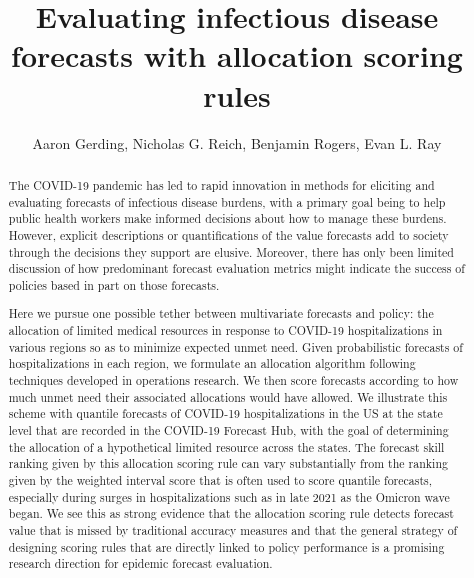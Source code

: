 \documentclass{article}\usepackage[]{graphicx}\usepackage[]{xcolor}
\title{Evaluating infectious disease forecasts with allocation scoring rules}
\author{Aaron Gerding, Nicholas G. Reich, Benjamin Rogers, Evan L. Ray}
\begin{document}
\newcommand{\del}[2]{\frac{\partial {#1} }{\partial {#2}} }
\newcommand{\dby}[2]{\frac{d {#1} }{d {#2}} }
\newcommand{\sbar}{\overline{s}}
\newtheorem{proposition}{Proposition}

\theoremstyle{remark}
\newtheorem*{remark}{Remark}

\maketitle







\begin{abstract}

The COVID-19 pandemic has led to rapid innovation in methods for eliciting and evaluating forecasts of infectious disease burdens, with a primary goal being to help public health workers make informed decisions about how to manage these burdens. However, explicit descriptions or quantifications of the value forecasts add to society through the decisions they support are elusive.  Moreover, there has only been limited discussion of how predominant forecast evaluation metrics might indicate the success of policies based in part on those forecasts.

Here we pursue one possible tether between multivariate forecasts and policy: the allocation of limited medical resources in response to COVID-19 hospitalizations in various regions so as to minimize expected unmet need. Given probabilistic forecasts of hospitalizations in each region, we formulate an allocation algorithm following techniques developed in operations research. We then score forecasts according to how much unmet need their associated allocations would have allowed. We illustrate this scheme with quantile forecasts of COVID-19 hospitalizations in the US at the state level that are recorded in the COVID-19 Forecast Hub, with the goal of determining the allocation of a hypothetical limited resource across the states. The forecast skill ranking given by this allocation scoring rule can vary substantially from the ranking given by the weighted interval score that is often used to score quantile forecasts, especially during surges in hospitalizations such as in late 2021 as the Omicron wave began. We see this as strong evidence that the allocation scoring rule detects forecast value that is missed by traditional accuracy measures and that the general strategy of designing scoring rules that are directly linked to policy performance is a promising research direction for epidemic forecast evaluation.

\end{abstract}
\end{document}
